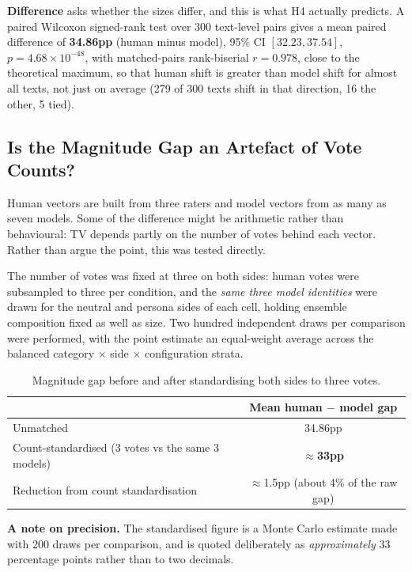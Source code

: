 \textbf{Difference} asks whether the sizes differ, and this is what H4 actually predicts. A
paired Wilcoxon signed-rank test over 300 text-level pairs gives a mean paired difference of
\textbf{34.86pp} (human minus model), 95\% CI $[32.23, 37.54]$, $p = 4.68\times10^{-48}$, with
matched-pairs rank-biserial $r = 0.978$, close to the theoretical maximum, so that human shift is
greater than model shift for almost all texts, not just on average (279 of 300 texts shift in
that direction, 16 the other, 5 tied).

\subsection{Is the Magnitude Gap an Artefact of Vote Counts?}
\label{res:h4counts}

\noindent
Human vectors are built from three raters and model vectors from as many as seven models. Some
of the difference might be arithmetic rather than behavioural: TV depends partly on the number of
votes behind each vector. Rather than argue the point, this was tested directly.

The number of votes was fixed at three on both sides: human votes were subsampled to three per
condition, and the \emph{same three model identities} were drawn for the neutral and persona
sides of each cell, holding ensemble composition fixed as well as size. Two hundred independent
draws per comparison were performed, with the point estimate an equal-weight average across the
balanced category $\times$ side $\times$ configuration strata.

\begin{table}[h]
\centering
\footnotesize
\caption{Magnitude gap before and after standardising both sides to three votes.}
\label{tab:h4counts}
\begin{tabular}{lc}
\hline
 & \textbf{Mean human $-$ model gap} \\
\hline
Unmatched & 34.86pp \\
Count-standardised (3 votes vs the same 3 models) & \textbf{$\approx$33pp} \\
\hline
Reduction from count standardisation & $\approx$1.5pp (about 4\% of the raw gap) \\
\hline
\end{tabular}
\end{table}

\noindent
\textbf{A note on precision.} The standardised figure is a Monte Carlo estimate made with 200
draws per comparison, and is quoted deliberately as \emph{approximately} 33 percentage points
rather than to two decimals.

